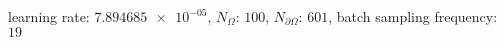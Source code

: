 learning rate: $\num[scientific-notation=true]{7.894685e-05}$, $N_{\Omega}$: $\num[scientific-notation=false]{100}$, $N_{\partial\Omega}$: $\num[scientific-notation=false]{601}$, batch sampling frequency: $\num[scientific-notation=false]{19}$